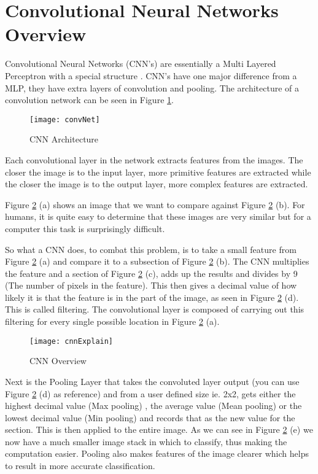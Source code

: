 \section{Convolutional Neural Networks Overview}
Convolutional Neural Networks (CNN's) are essentially a Multi Layered Perceptron with a
special structure \parencite{visualizing}. CNN's have one major difference from a MLP, they have extra
layers of convolution and pooling. The architecture of a convolution network can
be seen in Figure \ref{fig:convNet}.

\begin{figure}[h]
	\texttt{[image: convNet]}
	\caption{CNN Architecture}
	\label{fig:convNet}
\end{figure}

Each convolutional layer in the network extracts features from the images.
The closer the image is to the input layer, more primitive features are extracted while
the closer the image is to the output layer, more complex features are extracted.

Figure \ref{fig:cnnExplain} (a) shows an image that we want to compare against
Figure \ref{fig:cnnExplain} (b).
For humans, it is quite easy to determine that these images are very similar but
for a computer this task is surprisingly difficult.

So what a CNN does, to combat this problem, is to take a small feature from
Figure \ref{fig:cnnExplain} (a) and compare it to a subsection of Figure \ref{fig:cnnExplain} (b).
The CNN multiplies the feature and a section of Figure \ref{fig:cnnExplain} (c), adds
up the results and divides by 9 (The number of pixels in the feature). This then gives a decimal value of how likely
it is that the feature is in the part of the image, as seen in Figure
\ref{fig:cnnExplain} (d).
This is called filtering. The convolutional layer is composed of carrying out
this filtering for every single possible location in Figure \ref{fig:cnnExplain} (a).

\begin{figure}
    \texttt{[image: cnnExplain]}
    \caption{CNN Overview}
    \label{fig:cnnExplain}
\end{figure}
Next is the Pooling Layer that takes the convoluted
layer output (you can use Figure \ref{fig:cnnExplain} (d) as reference) and from a
user defined size ie. 2x2, gets either the highest decimal value (Max pooling)
, the average value (Mean pooling) or the lowest decimal value (Min pooling) and records that as the new value for the
section. This is then applied to the entire image. As we can see in Figure
\ref{fig:cnnExplain} (e) we now have a much smaller image stack in which to classify,
thus making the computation easier. Pooling also makes features of the image clearer which helps to result in more accurate classification.

